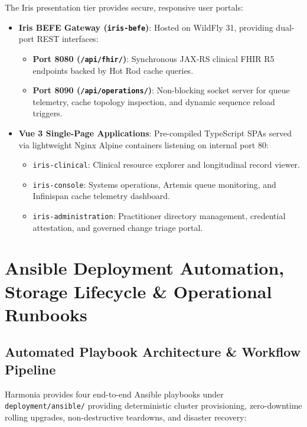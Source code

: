 The Iris presentation tier provides secure, responsive user portals:
\begin{itemize}
    \item \textbf{Iris BEFE Gateway (\texttt{iris-befe})}: Hosted on WildFly 31, providing dual-port REST interfaces:
    \begin{itemize}
        \item \textbf{Port 8080 (\texttt{/api/fhir/})}: Synchronous JAX-RS clinical FHIR R5 endpoints backed by Hot Rod cache queries.
        \item \textbf{Port 8090 (\texttt{/api/operations/})}: Non-blocking socket server for queue telemetry, cache topology inspection, and dynamic sequence reload triggers.
    \end{itemize}
    \item \textbf{Vue 3 Single-Page Applications}: Pre-compiled TypeScript SPAs served via lightweight Nginx Alpine containers listening on internal port 80:
    \begin{itemize}
        \item \texttt{iris-clinical}: Clinical resource explorer and longitudinal record viewer.
        \item \texttt{iris-console}: Systems operations, Artemis queue monitoring, and Infinispan cache telemetry dashboard.
        \item \texttt{iris-administration}: Practitioner directory management, credential attestation, and governed change triage portal.
    \end{itemize}
\end{itemize}

\section{Ansible Deployment Automation, Storage Lifecycle \& Operational Runbooks}
\label{sec:ansible_lifecycle}

\subsection{Automated Playbook Architecture \& Workflow Pipeline}

Harmonia provides four end-to-end Ansible playbooks under \texttt{deployment/ansible/} providing deterministic cluster provisioning, zero-downtime rolling upgrades, non-destructive teardowns, and disaster recovery:


